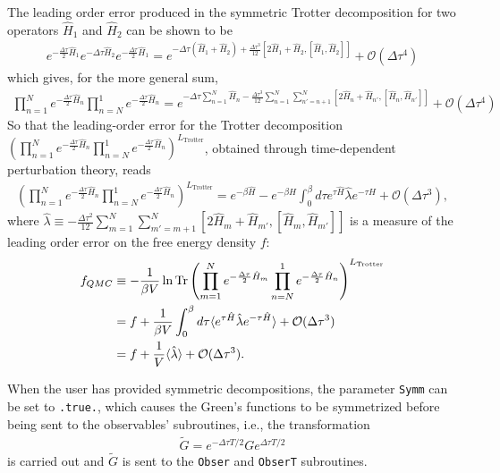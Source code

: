 The leading order error produced in the symmetric Trotter decomposition for two operators $\hat{H}_1 $ and $\hat{H}_2 $ can be shown to be
\begin{align}
e^{ -\frac{\Delta \tau}{2} \hat{H}_1 }  e^{  -\Delta \tau \hat{H}_2 }  e^{ - \frac{\Delta \tau}{2} \hat{H}_1 }
= e^{ -\Delta \tau (\hat{H}_1 + \hat{H}_2) + \frac{\Delta \tau^3}{12} [ 2 \hat{H}_1 + \hat{H}_2, [\hat{H}_1, \hat{H}_2  ] ] }  +  \mathcal{O} (\Delta \tau^4)
\end{align}
which gives, for the more general sum,
\begin{align}
\prod_{n=1}^{N}  e^{-\frac{\Delta \tau}{2} \hat{H}_n}      \prod_{n=N}^{1}  e^{-\frac{\Delta \tau}{2} \hat{H}_n}   
=   e^{- \Delta \tau \sum_{n=1}^N \hat{H}_n   - \frac{\Delta \tau^3}{12}  \sum_{n=1}^{N} \sum_{n'=n+1}^N  [ 2 \hat{H}_n + \hat{H}_{n'}, [\hat{H}_n, \hat{H}_{n'} ] ]  } 
+  \mathcal{O} (\Delta \tau^4 ) 
\end{align}
So that the leading-order error for the Trotter decomposition $ \left( \prod_{n=1}^{N}  e^{-\frac{\Delta \tau}{2} \hat{H}_n} \prod_{n=N}^{1}  e^{-\frac{\Delta \tau}{2} \hat{H}_n} \right)^{L_\text{Trotter}} $, obtained through time-dependent perturbation theory, reads
\begin{align}
\left( \prod_{n=1}^{N}  e^{-\frac{\Delta \tau}{2} \hat{H}_n}      \prod_{n=N}^{1}  e^{-\frac{\Delta \tau}{2} \hat{H}_n}  \right)^{L_\text{Trotter}}  
=  e^{- \beta \hat{H} } - e^{ -\beta \hat{H}} \int_0^{\beta}  d \tau  e^{\tau \hat{H}} \hat{\lambda}  e^{-\tau \hat{H}}   +  \mathcal{O} (\Delta \tau^3 ),
\end{align}
where $\hat{\lambda} \equiv -\frac{ \Delta \tau^2 }{12} \sum_{m=1}^N  \sum_{m'=m+1}^N  [2 \hat{H}_m + \hat{H}_{m'}, [\hat{H}_m , \hat{H}_{m'}] ] $  is a  measure of the leading order error on the free energy density $f$:
\begin{align}
f_{QMC} &\equiv  -\frac{1}{\beta V} \ln{ \mathop{\mathrm{Tr}}{  \left( \prod_{m=1}^{N}  e^{-\frac{\Delta \tau}{2} \hat{H}_m} \prod_{n=N}^{1}  e^{-\frac{\Delta \tau}{2} \hat{H}_n}  \right)^{L_\text{Trotter}}  } }      \\  
 & =  f + \frac{1}{\beta V} \int_0^{\beta} d\tau  
\langle  e^{\tau \hat{H}}  \hat{\lambda}  e^{- \tau \hat{H}} \rangle  + \mathcal{O} (\Delta \tau^3 ) \\  
 & = f + \frac{1}{ V }  \langle  \hat{\lambda}  \rangle  +  \mathcal{O} ( \Delta \tau^3 ).
\end{align}

When the user has provided symmetric decompositions, the parameter \texttt{Symm} can be set to \texttt{.true.}, which causes the Green's functions to be symmetrized before being sent to the observables' subroutines, i.e., the transformation
\begin{align}
\tilde{G} =  e^{-\Delta \tau T /2 } G e^{\Delta \tau T /2 }
\end{align}
is carried out and $ \tilde{G} $  is sent to the \texttt{Obser} and \texttt{ObserT} subroutines.


